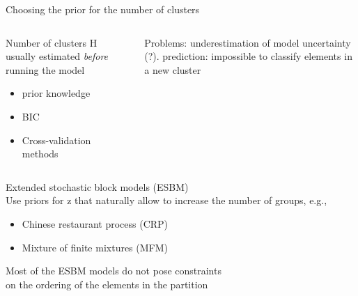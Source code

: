 \begin{frame}{Choosing the prior for the number of clusters}

\begin{columns}

\begin{column}{0.5\textwidth} 

    Number of clusters H usually estimated \textit{before} running the model
    \begin{itemize}
        \item prior knowledge
        \item BIC
        \item Cross-validation methods
    \end{itemize}
\end{column}

\begin{column}{0.5\textwidth}
    Problems: underestimation of model uncertainty (?). prediction: impossible to classify elements in a new cluster
\end{column}
\end{columns}

\alert{Extended stochastic block models (ESBM)}\\  
Use priors for z that naturally allow to increase the number of groups, e.g., 
    \begin{itemize}
        \item Chinese restaurant process (CRP)
        \item Mixture of finite mixtures (MFM)
    \end{itemize}

Most of the ESBM models do not pose constraints\\ on the \alert{ordering of the elements} in the partition
\end{frame}



